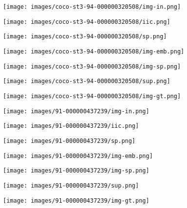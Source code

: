 \documentclass[letterpaper, 10 pt, journal, twoside]{IEEEtran}
\begin{document}
\begin{figure*}[htb]
    \par\smallskip
    \centering
    \begin{subfigure}[t]{0.125\textwidth}
      \texttt{[image: images/coco-st3-94-000000320508/img-in.png]}
    \end{subfigure}
    \begin{subfigure}[t]{0.125\textwidth}
      \texttt{[image: images/coco-st3-94-000000320508/iic.png]}
    \end{subfigure}    
    \begin{subfigure}[t]{0.125\textwidth}
      \texttt{[image: images/coco-st3-94-000000320508/sp.png]}
    \end{subfigure}    
    \begin{subfigure}[t]{0.125\textwidth}
      \texttt{[image: images/coco-st3-94-000000320508/img-emb.png]}
     \end{subfigure}
    \begin{subfigure}[t]{0.125\textwidth}
      \texttt{[image: images/coco-st3-94-000000320508/img-sp.png]}
    \end{subfigure}
    \begin{subfigure}[t]{0.125\textwidth}
      \texttt{[image: images/coco-st3-94-000000320508/sup.png]}
    \end{subfigure}
    \begin{subfigure}[t]{0.125\textwidth}
      \texttt{[image: images/coco-st3-94-000000320508/img-gt.png]}
    \end{subfigure}

    \par\smallskip
    \centering
    \begin{subfigure}[t]{0.125\textwidth}
      \texttt{[image: images/91-000000437239/img-in.png]}
    \end{subfigure}
    \begin{subfigure}[t]{0.125\textwidth}
      \texttt{[image: images/91-000000437239/iic.png]}
    \end{subfigure}
    \begin{subfigure}[t]{0.125\textwidth}
      \texttt{[image: images/91-000000437239/sp.png]}
    \end{subfigure}
    \begin{subfigure}[t]{0.125\textwidth}
      \texttt{[image: images/91-000000437239/img-emb.png]}
     \end{subfigure}
    \begin{subfigure}[t]{0.125\textwidth}
      \texttt{[image: images/91-000000437239/img-sp.png]}
    \end{subfigure}
    \begin{subfigure}[t]{0.125\textwidth}
      \texttt{[image: images/91-000000437239/sup.png]}
    \end{subfigure}
    \begin{subfigure}[t]{0.125\textwidth}
      \texttt{[image: images/91-000000437239/img-gt.png]}
    \end{subfigure}   
    

\end{figure*}
\end{document}
